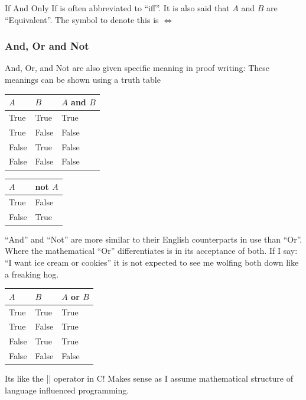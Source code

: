 \documentclass{article}
\theoremstyle{definition}
\theoremstyle{definition}
\begin{document}
If And Only If is often abbreviated to ``iff''. It is also said that $A$ and $B$
are ``Equivalent''.
The symbol to denote this is $\iff$

\subsubsection*{And, Or and Not}
And, Or, and Not are also given specific meaning in proof writing:
These meanings can be shown using a truth table
\begin{center}
   \begin{tabular}{l|l||l}
       $A$ & $B$ & $A$ and $B$\\
       \hline
       True & True & True\\
       True & False & False\\
       False & True & False\\
       False & False & False\\
   \end{tabular}

\end{center}
 
\begin{center}
   \begin{tabular}{l||l}
       $A$ & not $A$\\
       \hline
       True & False\\
       False & True\\
   \end{tabular}
\end{center}

``And'' and ``Not'' are more similar to their English counterparts in use than
``Or''. Where the mathematical ``Or'' differentiates is in its acceptance of both.
If I say: ``I want ice cream or cookies'' it is not expected to see me wolfing both
down like a freaking hog.

\begin{center}
    \begin{tabular}{l|l||l}
        $A$ & $B$ & $A$ or $B$\\
        \hline
        True & True & True\\
        True & False & True\\
        False & True & True\\
        False & False & False\\
    \end{tabular}
\end{center}

Its like the || operator in C! Makes sense as I assume mathematical structure of
language influenced programming. 
    
\end{document}
